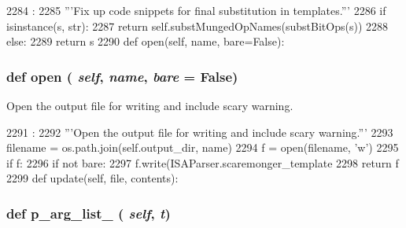 \begin{DoxyCode}
2284                              :
2285         '''Fix up code snippets for final substitution in templates.'''
2286         if isinstance(s, str):
2287             return self.substMungedOpNames(substBitOps(s))
2288         else:
2289             return s
2290 
    def open(self, name, bare=False):
\end{DoxyCode}
\hypertarget{classisa__parser_1_1ISAParser_ae4b82667a73596ae2d8042e9b4be8a95}{
\subsubsection[{open}]{\setlength{\rightskip}{0pt plus 5cm}def open ( {\em self}, \/   {\em name}, \/   {\em bare} = {\ttfamily False})}}
\label{classisa__parser_1_1ISAParser_ae4b82667a73596ae2d8042e9b4be8a95}
\begin{DoxyVerb}Open the output file for writing and include scary warning.\end{DoxyVerb}
 


\begin{DoxyCode}
2291                                     :
2292         '''Open the output file for writing and include scary warning.'''
2293         filename = os.path.join(self.output_dir, name)
2294         f = open(filename, 'w')
2295         if f:
2296             if not bare:
2297                 f.write(ISAParser.scaremonger_template %
2298         return f
2299 
    def update(self, file, contents):
\end{DoxyCode}
\hypertarget{classisa__parser_1_1ISAParser_a4048a5c0b52149895015080981d56fd4}{
\subsubsection[{p\_\-arg\_\-list\_\-0}]{\setlength{\rightskip}{0pt plus 5cm}def p\_\-arg\_\-list\_ ( {\em self}, \/   {\em t})}}
\label{classisa__parser_1_1ISAParser_a4048a5c0b52149895015080981d56fd4}



